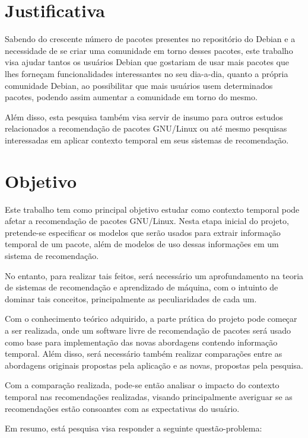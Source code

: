 \section{Justificativa}

Sabendo do crescente número de pacotes presentes no repositório do Debian e a
necessidade de se criar uma comunidade em torno desses pacotes, este trabalho
visa ajudar tantos os usuários Debian que gostariam de usar mais pacotes que
lhes forneçam funcionalidades interessantes no seu dia-a-dia, quanto a própria
comunidade Debian, ao possibilitar que mais usuários usem determinados pacotes,
podendo assim aumentar a comunidade em torno do mesmo.

Além disso, esta pesquisa também visa servir de insumo para outros estudos
relacionados a recomendação de pacotes GNU/Linux ou até mesmo pesquisas
interessadas em aplicar contexto temporal em seus sistemas de recomendação.

\section{Objetivo}

Este trabalho tem como principal objetivo estudar como contexto temporal pode
afetar a recomendação de pacotes GNU/Linux. Nesta etapa inicial do projeto,
pretende-se especificar os modelos que serão usados para extrair informação
temporal de um pacote, além de modelos de uso dessas informações em um sistema
de recomendação.

No entanto, para realizar tais feitos, será necessário um aprofundamento na
teoria de sistemas de recomendação e aprendizado de máquina, com o intuinto de
dominar tais conceitos, principalmente as peculiaridades de cada um.

Com o conhecimento teórico adquirido, a parte prática do projeto pode começar a
ser realizada, onde um software livre de recomendação de pacotes será usado como
base para implementação das novas abordagens contendo informação temporal. Além
disso, será necessário também realizar comparações entre as abordagens originais
propostas pela aplicação e as novas, propostas pela pesquisa.

Com a comparação realizada, pode-se então analisar o impacto do contexto
temporal nas recomendações realizadas, visando principalmente averiguar se as
recomendações estão consoantes com as expectativas do usuário.

Em resumo, está pesquisa visa responder a seguinte questão-problema:

